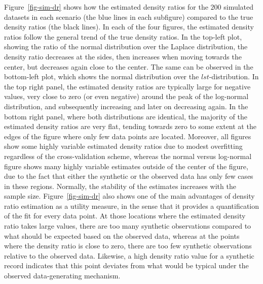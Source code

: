 \documentclass[
]{template/style/uneceart}
\begin{document}
Figure~\ref{fig-sim-dr} shows how the estimated density ratios for the
\(200\) simulated datasets in each scenario (the blue lines in each
subfigure) compared to the true density ratios (the black lines). In
each of the four figures, the estimated density ratios follow the
general trend of the true density ratios. In the top-left plot, showing
the ratio of the normal distribution over the Laplace distribution, the
density ratio decreases at the sides, then increases when moving towards
the center, but decreases again close to the center. The same can be
observed in the bottom-left plot, which shows the normal distribution
over the \(lst\)-distribution. In the top right panel, the estimated
density ratios are typically large for negative values, very close to
zero (or even negative) around the peak of the log-normal distribution,
and subsequently increasing and later on decreasing again. In the bottom
right panel, where both distributions are identical, the majority of the
estimated density ratios are very flat, tending towards zero to some
extent at the edges of the figure where only few data points are
located. Moreover, all figures show some highly variable estimated
density ratios due to modest overfitting regardless of the
cross-validation scheme, whereas the normal versus log-normal figure
shows many highly variable estimates outside of the center of the
figure, due to the fact that either the synthetic or the observed data
has only few cases in these regions. Normally, the stability of the
estimates increases with the sample size. Figure~\ref{fig-sim-dr} also
shows one of the main advantages of density ratio estimation as a
utility measure, in the sense that it provides a quantification of the
fit for every data point. At those locations where the estimated density
ratio takes large values, there are too many synthetic observations
compared to what should be expected based on the observed data, whereas
at the points where the density ratio is close to zero, there are too
few synthetic observations relative to the observed data. Likewise, a
high density ratio value for a synthetic record indicates that this
point deviates from what would be typical under the observed
data-generating mechanism.
\end{document}
